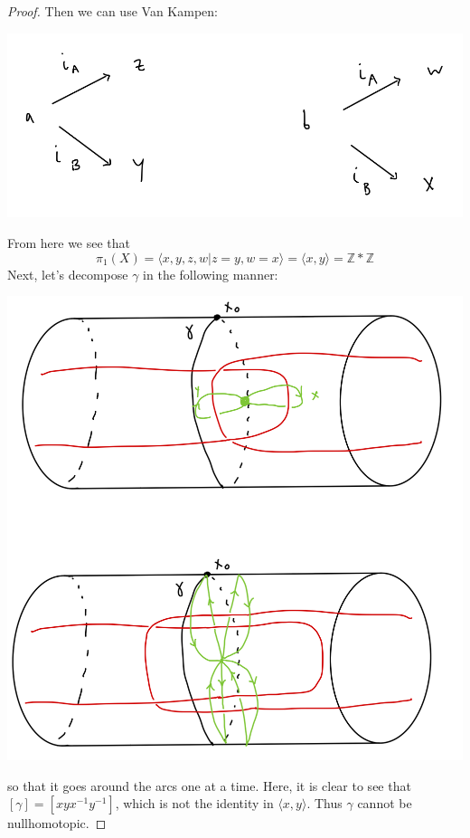 \documentclass[12pt]{article}
\begin{document}
\begin{proof}
  Then we can use Van Kampen:
  \par \begin{center} \includegraphics[scale=.2]{1-6.png} \end{center}
  From here we see that 
  \begin{equation*}
    \pi_1(X) = \langle x,y,z,w \vert z=y,w=x \rangle = \langle x,y \rangle = \mathbb{Z} * \mathbb{Z} 
  \end{equation*}
  Next, let's decompose $\gamma$ in the following manner: 
  \par \begin{center} \includegraphics[scale=.2]{1-7.png} \end{center}
  so that it goes around the arcs one at a time. Here, it is clear to see that $[ \gamma ] = [xyx^{-1}y^{-1}]$, 
  which is not the identity in $\langle x,y \rangle$. Thus $\gamma$ cannot be nullhomotopic.
\end{proof}
\end{document}

